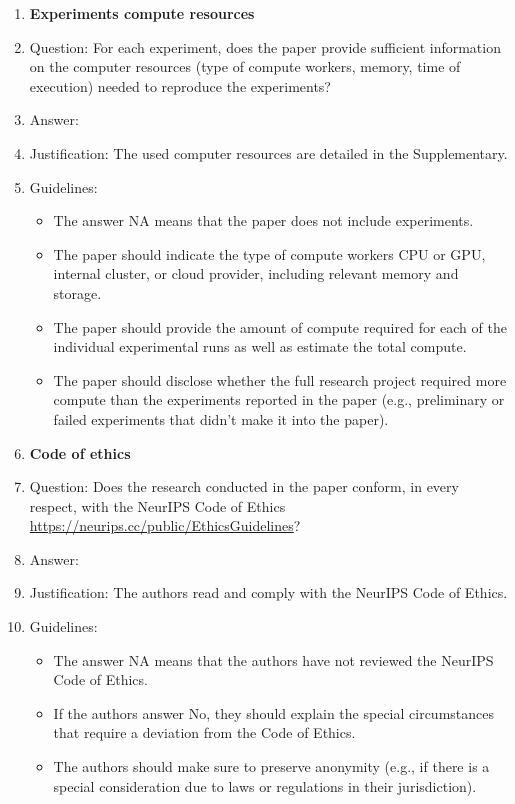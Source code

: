 \documentclass{article}
\theoremstyle{definition} \newtheorem{definition}{Definition}  \newtheorem{example}{Example}
\theoremstyle{remark} \newtheorem{remark}{Remark}
\newcounter{ct}
\begin{document}
\begin{enumerate}
\item {\bf Experiments compute resources}
    \item[] Question: For each experiment, does the paper provide sufficient information on the computer resources (type of compute workers, memory, time of execution) needed to reproduce the experiments?
    \item[] Answer: \answerYes{} %
    \item[] Justification: The used computer resources are detailed in the Supplementary.
    \item[] Guidelines:
    \begin{itemize}
        \item The answer NA means that the paper does not include experiments.
        \item The paper should indicate the type of compute workers CPU or GPU, internal cluster, or cloud provider, including relevant memory and storage.
        \item The paper should provide the amount of compute required for each of the individual experimental runs as well as estimate the total compute. 
        \item The paper should disclose whether the full research project required more compute than the experiments reported in the paper (e.g., preliminary or failed experiments that didn't make it into the paper). 
    \end{itemize}
    
\item {\bf Code of ethics}
    \item[] Question: Does the research conducted in the paper conform, in every respect, with the NeurIPS Code of Ethics \url{https://neurips.cc/public/EthicsGuidelines}?
    \item[] Answer: \answerYes{} %
    \item[] Justification: The authors read and comply with the  NeurIPS Code of Ethics.
    \item[] Guidelines:
    \begin{itemize}
        \item The answer NA means that the authors have not reviewed the NeurIPS Code of Ethics.
        \item If the authors answer No, they should explain the special circumstances that require a deviation from the Code of Ethics.
        \item The authors should make sure to preserve anonymity (e.g., if there is a special consideration due to laws or regulations in their jurisdiction).
    \end{itemize}



\end{enumerate}
\end{document}
